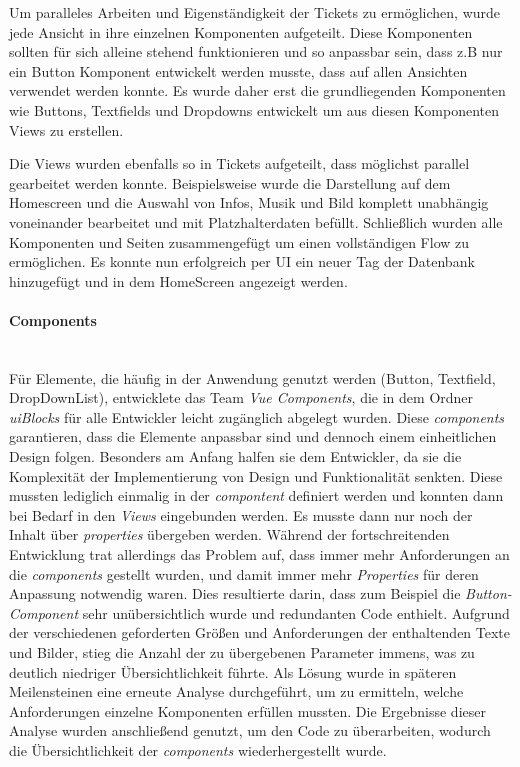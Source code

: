 \documentclass[10pt, a4paper]{article}
\begin{document}
\begin{onehalfspace}
Um paralleles Arbeiten und Eigenständigkeit der Tickets zu ermöglichen, wurde jede Ansicht in ihre einzelnen Komponenten aufgeteilt.
Diese Komponenten sollten für sich alleine stehend funktionieren und so anpassbar sein, dass z.B nur ein Button Komponent entwickelt werden musste, dass auf
allen Ansichten verwendet werden konnte. Es wurde daher erst die grundliegenden Komponenten wie Buttons, Textfields und Dropdowns entwickelt um aus diesen
Komponenten Views zu erstellen.

Die Views wurden ebenfalls so in Tickets aufgeteilt, dass möglichst parallel gearbeitet werden konnte.
Beispielsweise wurde die Darstellung auf dem Homescreen und die Auswahl von Infos, Musik und Bild komplett unabhängig voneinander bearbeitet und mit Platzhalterdaten befüllt.
Schließlich wurden alle Komponenten und Seiten zusammengefügt um einen vollständigen Flow zu ermöglichen.
Es konnte nun erfolgreich per UI ein neuer Tag der Datenbank hinzugefügt und in dem HomeScreen angezeigt werden.

\paragraph*{Components}$~$ \\
Für Elemente, die häufig in der Anwendung genutzt werden (Button, Textfield, DropDownList),
entwicklete das Team \textit{Vue Components}, die in dem Ordner \textit{uiBlocks} für alle Entwickler leicht zugänglich abgelegt wurden.
Diese \textit{components} garantieren, dass die Elemente anpassbar sind und dennoch einem einheitlichen Design folgen.
Besonders am Anfang halfen sie dem Entwickler, da sie die Komplexität der Implementierung von Design und Funktionalität senkten.
Diese mussten lediglich einmalig in der \textit{compontent} definiert werden und konnten dann bei Bedarf in den \textit{Views} eingebunden werden.
Es musste dann nur noch der Inhalt über \textit{properties} übergeben werden.
Während der fortschreitenden Entwicklung trat allerdings das Problem auf, dass immer mehr Anforderungen an die \textit{components} gestellt wurden,
 und damit immer mehr \textit{Properties} für deren Anpassung notwendig waren.
 Dies resultierte darin, dass zum Beispiel die \textit{Button-Component} sehr unübersichtlich wurde und redundanten Code enthielt.
Aufgrund der verschiedenen geforderten Größen und Anforderungen der enthaltenden Texte und Bilder,
 stieg die Anzahl der zu übergebenen Parameter immens, was zu deutlich niedriger Übersichtlichkeit führte.
Als Lösung wurde in späteren Meilensteinen eine erneute Analyse durchgeführt, um zu ermitteln, welche Anforderungen einzelne Komponenten erfüllen mussten.
Die Ergebnisse dieser Analyse wurden anschließend genutzt, um den Code zu überarbeiten, wodurch die Übersichtlichkeit der \textit{components} wiederhergestellt wurde.


\end{onehalfspace}
\end{document}
